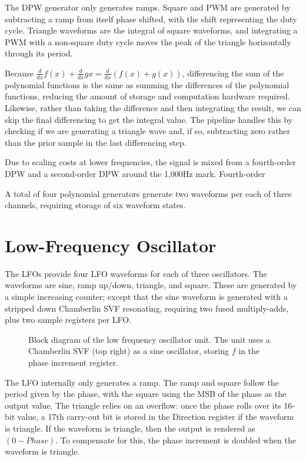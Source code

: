 The DPW generator only generates ramps.  Square and PWM are generated by subtracting a ramp from itself phase shifted, with the shift representing the duty cycle.  Triangle waveforms are the integral of square waveforms, and integrating a PWM with a non-square duty cycle moves the peak of the triangle horizontally through its period.

Because $\frac{d}{dx}f(x)+\frac{d}{dx}g{x}=\frac{d}{dx}(f(x)+g(x))$, differencing the sum of the polynomial functions is the same as summing the differences of the polynomial functions, reducing the amount of storage and computation hardware required.  Likewise, rather than taking the difference and then integrating the result, we can skip the final differencing to get the integral value.  The pipeline handles this by checking if we are generating a triangle wave and, if so, subtracting zero rather than the prior sample in the last differencing step.

Due to scaling costs at lower frequencies, the signal is mixed from a fourth-order DPW and a second-order DPW around the 1,000Hz mark.  Fourth-order

A total of four polynomial generators generate two waveforms per each of three channels, requiring storage of six waveform states.


\section{Low-Frequency Oscillator}

The LFOs provide four LFO waveforms for each of three oscillators.  The waveforms are sine, ramp up/down, triangle, and square.  These are generated by a simple increasing counter; except that the sine waveform is generated with a stripped down Chamberlin SVF resonating, requiring two fused multiply-adds, plus two sample registers per LFO.

\begin{figure}[ht]
    \centering
    
    \caption{\label{fig:lfo-block-diagram} Block diagram of the low frequency oscillator unit.  The unit uses a Chamberlin SVF (top right) as a sine oscillator, storing $f$ in the phase increment register.}
\end{figure}


The LFO internally only generates a ramp.  The ramp and square follow the period given by the phase, with the square using the MSB of the phase as the output value.  The triangle relies on an overflow:  once the phase rolls over its 16-bit value, a 17th carry-out bit is stored in the Direction register if the waveform is triangle.  If the waveform is triangle, then the output is rendered as $(0-Phase)$.  To compensate for this, the phase increment is doubled when the waveform is triangle.


